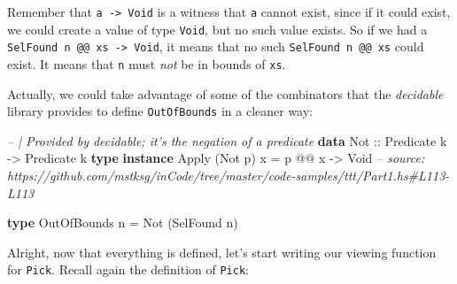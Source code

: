 \documentclass[]{article}
\newenvironment{Shaded}{}{}
\newcommand{\CommentTok}[1]{\textcolor[rgb]{0.38,0.63,0.69}{\textit{#1}}}
\newcommand{\DataTypeTok}[1]{\textcolor[rgb]{0.56,0.13,0.00}{#1}}
\newcommand{\FunctionTok}[1]{\textcolor[rgb]{0.02,0.16,0.49}{#1}}
\newcommand{\KeywordTok}[1]{\textcolor[rgb]{0.00,0.44,0.13}{\textbf{#1}}}
\newcommand{\NormalTok}[1]{#1}
\newcommand{\OtherTok}[1]{\textcolor[rgb]{0.00,0.44,0.13}{#1}}
\begin{document}
Remember that \texttt{a\ -\textgreater{}\ Void} is a witness that \texttt{a}
cannot exist, since if it could exist, we could create a value of type
\texttt{Void}, but no such value exists. So if we had a
\texttt{SelFound\ n\ @@\ xs\ -\textgreater{}\ Void}, it means that no such
\texttt{SelFound\ n\ @@\ xs} could exist. It means that \texttt{n} must
\emph{not} be in bounds of \texttt{xs}.

Actually, we could take advantage of some of the combinators that the
\emph{decidable} library provides to define \texttt{OutOfBounds} in a cleaner
way:

\begin{Shaded}
\begin{Highlighting}[]
\CommentTok{-- | Provided by decidable; it's the negation of a predicate}
\KeywordTok{data} \DataTypeTok{Not}\OtherTok{ ::} \DataTypeTok{Predicate}\NormalTok{ k }\OtherTok{->} \DataTypeTok{Predicate}\NormalTok{ k}
\KeywordTok{type} \KeywordTok{instance} \DataTypeTok{Apply}\NormalTok{ (}\DataTypeTok{Not}\NormalTok{ p) x }\FunctionTok{=}\NormalTok{ p }\FunctionTok{@@}\NormalTok{ x }\OtherTok{->} \DataTypeTok{Void}
\CommentTok{-- source: https://github.com/mstksg/inCode/tree/master/code-samples/ttt/Part1.hs#L113-L113}

\KeywordTok{type} \DataTypeTok{OutOfBounds}\NormalTok{ n }\FunctionTok{=} \DataTypeTok{Not}\NormalTok{ (}\DataTypeTok{SelFound}\NormalTok{ n)}
\end{Highlighting}
\end{Shaded}

Alright, now that everything is defined, let's start writing our viewing
function for \texttt{Pick}. Recall again the definition of \texttt{Pick}:
\end{document}
